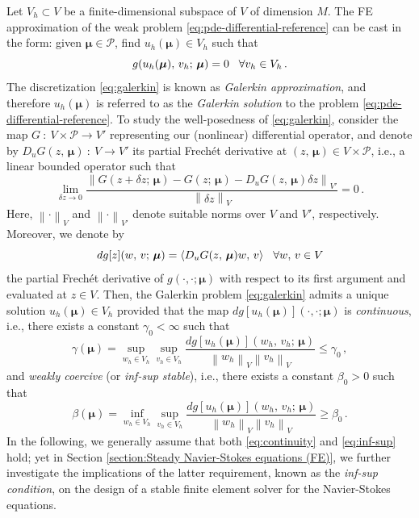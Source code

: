 \documentclass[12pt, a4paper, twoside, openright, notitlepage]{report}
\numberwithin{equation}{chapter}
\theoremstyle{theorem}
\theoremstyle{definition}
\theoremstyle{remark}
\theoremstyle{proposition}
\numberwithin{figure}{chapter}
\newcommand{\norm}[1]{\left\lVert#1\right\rVert}
\newcommand{\bg}[1]{\boldsymbol{#1}}
\begin{document}
		Let $V_h \subset V$ be a finite-dimensional subspace of $V$ of dimension $M$. The FE approximation of the weak problem \eqref{eq:pde-differential-reference} can be cast in the form: given $\bg{\mu} \in \mathcal{P}$, find $u_h(\bg{\mu}) \in V_h$ such that 
		\begin{equation}
			\label{eq:galerkin}
			g(u_h(\bg{\mu}), \, v_h; \, \bg{\mu}) = 0 \hspace*{0.3cm} \forall v_h \in V_h \, .
		\end{equation}
		The discretization \eqref{eq:galerkin} is known as \emph{Galerkin approximation}, and therefore $u_h(\bg{\mu})$ is referred to as the \emph{Galerkin solution} to the problem \eqref{eq:pde-differential-reference}. To study the well-posedness of \eqref{eq:galerkin}, consider the map $G ~ : ~ V \times \mathcal{P} \rightarrow V'$ representing our (nonlinear) differential operator, and denote by $D_u G(z, \, \bg{\mu}) ~ : ~ V \rightarrow V'$ its partial Frech\'et derivative at $(z, \, \bg{\mu}) \in V \times \mathcal{P}$, i.e., a linear bounded operator such that \cite{Rud64}
		\begin{equation*}
			\lim_{\delta z \to 0} \dfrac{\norm{G(z + \delta z; \, \bg{\mu}) - G(z; \, \bg{\mu}) - D_u G(z, \, \bg{\mu})\delta z}_{V'}}{\norm{\delta z}_V}  = 0 \, .
		\end{equation*}
		Here, $\norm{\cdot}_V$ and $\norm{\cdot}_{V'}$ denote suitable norms over $V$ and $V'$, respectively. Moreover, we denote by
		\begin{equation*}
			dg[z](w, \, v; \, \bg{\mu}) = \langle D_u G(z, \, \bg{\mu}) w, \, v \rangle \hspace*{0.3cm} \forall w, \, v \in V
		\end{equation*}
		the partial Frech\'et derivative of $g(\cdot, \cdot; \bg{\mu})$ with respect to its first argument and evaluated at $z \in V$. Then, the Galerkin problem \eqref{eq:galerkin} admits a unique solution $u_h(\bg{\mu}) \in V_h$ provided that the map $dg[u_h(\bg{\mu})](\cdot,\cdot; \bg{\mu})$ is \emph{continuous}, i.e., there exists a constant $\gamma_0 < \infty$ such that
		\begin{equation}
			\label{eq:continuity}
			\gamma(\bg{\mu}) = \sup_{w_h \in V_h} \sup_{v_h \in V_h} \dfrac{dg[u_h(\bg{\mu})](w_h, \, v_h; \, \bg{\mu})}{\norm{w_h}_V \norm{v_h}_V} \leq \gamma_0 \, ,
		\end{equation}
		and \emph{weakly coercive} (or \emph{inf-sup stable}), i.e., there exists a constant $\beta_0 > 0$ such that
		\begin{equation}
			\label{eq:inf-sup}
			\beta(\bg{\mu}) = \inf_{w_h \in V_h} \sup_{v_h \in V_h} \dfrac{dg[u_h(\bg{\mu})](w_h, \, v_h; \, \bg{\mu})}{\norm{w_h}_V \norm{v_h}_V} \geq \beta_0 \, .
		\end{equation}
		In the following, we generally assume that both \eqref{eq:continuity} and \eqref{eq:inf-sup} hold; yet in Section \ref{section:Steady Navier-Stokes equations (FE)}, we further investigate the implications of the latter requirement, known as the \emph{inf-sup condition}, on the design of a stable finite element solver for the Navier-Stokes equations.
		
\end{document}

